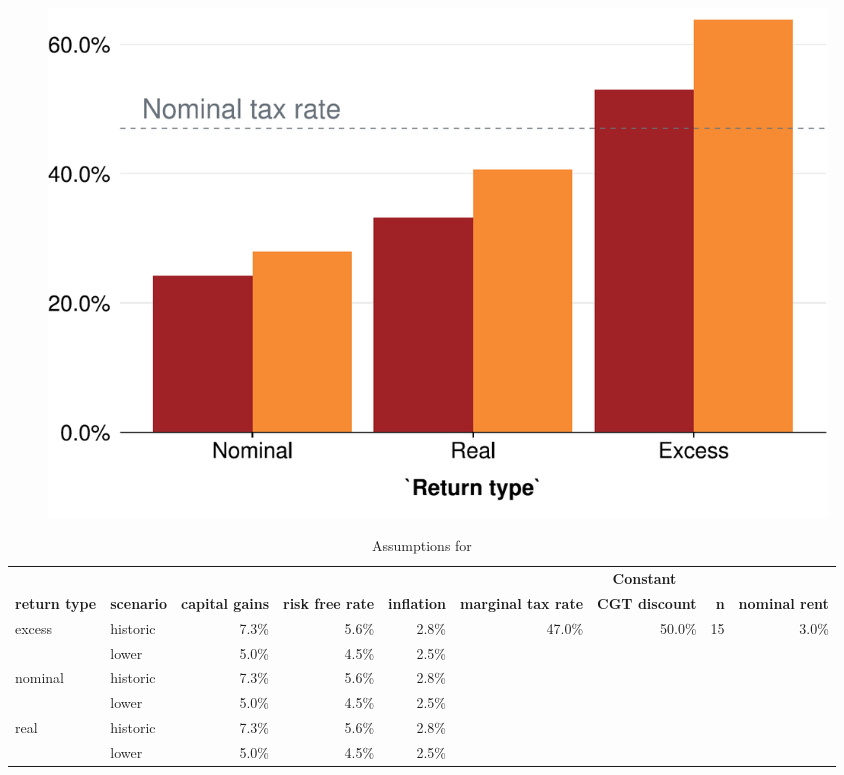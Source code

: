 \documentclass{grattan}\usepackage[]{graphicx}\usepackage[]{color}
\begin{document}
\begin{figure}[hb]


\includegraphics[width=\columnwidth]{CGT-NG-atlas//EMTR-nominal-real-excess-historic-vs-lower-1}
\end{figure}
\begin{table}
\centering
\caption{Assumptions for }
\small
\begin{tabularx}{\linewidth}{llrrrrrrr}
  \toprule
   &  &  &  &  & \multicolumn{4}{c}{\textbf{Constant}}\\
 \cmidrule(lr){6-9}
 \textbf{return type} & \textbf{scenario} & \textbf{capital gains} & \textbf{risk free rate} & \textbf{inflation} & \textbf{marginal tax rate} & \textbf{CGT discount} & \textbf{n} & \textbf{nominal rent}\\
 \midrule
excess & historic & 7.3\% & 5.6\% & 2.8\% & 47.0\% & 50.0\% & 15 & 3.0\% \\ 
   & lower & 5.0\% & 4.5\% & 2.5\% &  &  &  &  \\ 
  nominal & historic & 7.3\% & 5.6\% & 2.8\% &  &  &  &  \\ 
   & lower & 5.0\% & 4.5\% & 2.5\% &  &  &  &  \\ 
  real & historic & 7.3\% & 5.6\% & 2.8\% &  &  &  &  \\ 
   & lower & 5.0\% & 4.5\% & 2.5\% &  &  &  &  \\ 
   \bottomrule
\end{tabularx}

\end{table}
\end{document}
